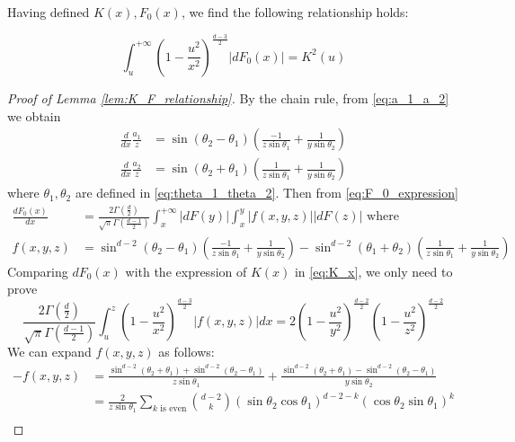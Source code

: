 \documentclass{aptpub}
\begin{document}
Having defined $K(x), F_0(x)$, we find the following relationship holds:
\begin{lemma}\label{lem:K_F_relationship}
\begin{equation}\label{eq:F_0_integration}
     \int_u^{+\infty}
     (1-\frac{u^2}{x^2})^{\frac{d-3}{2}} |dF_0(x)| = K^2(u)
\end{equation}
\end{lemma}
\begin{proof}[Proof of Lemma \ref{lem:K_F_relationship}]
     By the chain rule, from \eqref{eq:a_1_a_2} we obtain
\begin{align*}
    \frac{d}{dx}\frac{a_1}{z} &
    = \sin(\theta_2 - \theta_1)
    \left(\frac{-1}{z\sin\theta_1}
    +\frac{1}{y\sin \theta_2}\right)\\
    \frac{d}{dx}\frac{a_2}{z} &
    = \sin(\theta_2 + \theta_1)
    \left(\frac{1}{z\sin\theta_1}
    +\frac{1}{y\sin \theta_2}\right)
\end{align*}
where $\theta_1, \theta_2$ are defined in \eqref{eq:theta_1_theta_2}.
Then from \eqref{eq:F_0_expression}
\begin{align*}
    \frac{d F_0(x)}{dx} & =\frac{2\Gamma(\frac{d}{2})}
    {\sqrt{\pi}\Gamma(\frac{d-1}{2})}
    \int_x^{+\infty} |dF(y)| \int_x^y |f(x,y,z)| |dF(z)| 
    \textrm{ where }\\
    f(x,y,z) & = \sin^{d-2} (\theta_2 - \theta_1)
    \left(\frac{-1}{z\sin\theta_1}
    +\frac{1}{y\sin \theta_2}\right)
    - \sin^{d-2}(\theta_1 + \theta_2)
    \left(\frac{1}{z\sin\theta_1}
    +\frac{1}{y\sin \theta_2}\right)
\end{align*}
Comparing $dF_0(x)$
with the expression of $K(x)$ in
\eqref{eq:K_x},
we only need to prove
\begin{equation}\label{eq:ref_prove_integration}    
    \frac{2\Gamma(\frac{d}{2})}
    {\sqrt{\pi}\Gamma(\frac{d-1}{2})}
    \int_u^z (1-\frac{u^2}{x^2})^{\frac{d-3}{2}}
    |f(x,y,z)|dx =
    2(1-\frac{u^2}{y^2})^{\frac{d-2}{2}}
    (1-\frac{u^2}{z^2})^{\frac{d-2}{2}}
\end{equation}
We can expand $f(x,y,z)$ as follows:
\begin{align*}
-f(x,y,z)&=\frac{\sin^{d-2}(\theta_2+\theta_1)
+ \sin^{d-2}(\theta_2 - \theta_1)}{z\sin\theta_1}
+\frac{\sin^{d-2}(\theta_2+\theta_1)
- \sin^{d-2}(\theta_2 - \theta_1)}{y\sin\theta_2} \\
&=\frac{2}{z\sin\theta_1}\sum_{k \textrm{ is even}}
\binom{d-2}{k} (\sin\theta_2\cos\theta_1)^{d-2-k}
(\cos\theta_2 \sin\theta_1)^k \\

\end{align*}
\end{proof}
\end{document}
